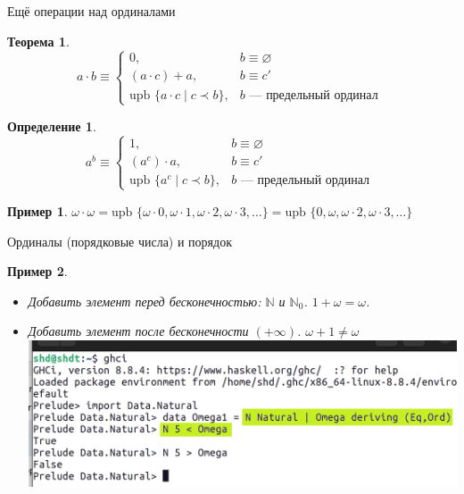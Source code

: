 \documentclass[aspectratio=169]{beamer}
\newtheorem{thm}{Теорема}[section]
\newtheorem{dfn}{Определение}[section]
\newtheorem{exm}{Пример}[section]
\begin{document}
\begin{frame}{Ещё операции над ординалами}
\begin{thm}
$$a \cdot b \equiv \left\{ \begin{array}{rl} 
   0, & b \equiv \varnothing\\
   (a \cdot c) + a, & b \equiv c'\\
   \text{upb } \{ a \cdot c \mid c \prec b \}, &\mbox{$b$ --- предельный ординал }\end{array}\right.$$
\end{thm}
\pause
\begin{dfn}
$$a ^ b \equiv \left\{ \begin{array}{rl} 
   1, & b \equiv \varnothing\\
   (a ^ c) \cdot a, & b \equiv c'\\
   \text{upb } \{ a^c \mid c \prec b \}, &\mbox{$b$ --- предельный ординал }\end{array}\right.$$
\end{dfn}
\pause
\begin{exm}$\omega \cdot \omega = \text{upb }\{\omega \cdot 0, \omega \cdot 1,\omega\cdot 2, \omega\cdot 3, \dots\} = \text{upb }\{0, \omega,\omega\cdot 2, \omega\cdot 3, \dots\}$\end{exm}
\end{frame}

\begin{frame}{Ординалы (порядковые числа) и порядок}
\begin{exm}\begin{itemize}
\item Добавить элемент перед бесконечностью: $\mathbb{N}$ и $\mathbb{N}_0$.
\pause
$1 + \omega = \omega$. \pause
\item Добавить элемент после бесконечности $(+\infty)$. \pause $\omega + 1 \ne \omega$ \pause
\includegraphics[scale=0.9]{lection-13-ghc}
\end{itemize}\end{exm} 
\end{frame}
\end{document}
